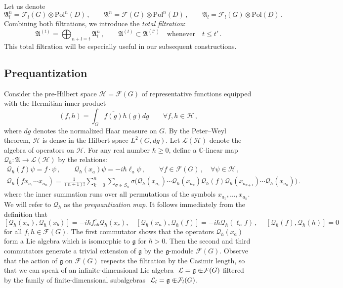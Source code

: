 \documentclass[12pt,a4paper]{article}
\numberwithin{equation}{section}
\theoremstyle{theorem}
\theoremstyle{remark}
\newcommand{\hh}{\mathcal{H}}
\newcommand{\fg}{\mathcal{F}(G)}
\newcommand{\fa}{\mathfrak{A}}
\newcommand{\qq}{\mathcal{Q}_{\hbar}}
\begin{document}
Let us denote 
$$
\fa^n_l=\mathcal{F}_l(G)\otimes \mathrm{Pol}^n(D)\,,\qquad \fa^n=\fg\otimes \mathrm{Pol}^n(D)\,,\qquad \fa_l=\mathcal{F}_l(G)\otimes \mathrm{Pol}(D)\,.
$$
Combining both filtrations, we introduce  the {\it total filtration}: 
\begin{equation}\label{TF}
\fa^{(t)}=\bigoplus_{n+l=t}\fa_l^n\,,\qquad \fa^{(t)}\subset \fa^{(t')}\quad\mbox{whenever}\quad t\leq t'\,.
\end{equation}
This total filtration will be especially useful in our subsequent constructions. 

\subsection{Prequantization}\label{pre-Q}
Consider the pre-Hilbert space $\hh=\fg$ of representative functions equipped with the Hermitian inner product
\begin{equation}
    (f,h)=\int_G\overline{ f(g)} h(g)dg\qquad \forall f, h\in \hh\,,
\end{equation}
where $dg$ denotes the normalized Haar measure on $G$. By the Peter--Weyl theorem, $\hh$ is dense in the Hilbert space $L^2(G, dg)$. Let $\mathscr{L}(\hh)$ denote the algebra of operators on $\hh$.  For any real number $\hbar\geq 0$, define a $\mathbb{C}$-linear  map 
$\qq:\fa\rightarrow \mathscr{L}(\hh)$ by the relations:
\begin{equation}\label{PQ}
\begin{array}{c}
   \qq(f)\psi=f\cdot \psi\,,\qquad  \qq(x_a)\psi=-i\hbar\ell_a\psi \,,\qquad \forall f\in \fg\,,\quad\forall \psi\in\hh\,,\\[5mm]
 \displaystyle    \qq(fx_{a_1}\cdots x_{a_n})=\frac{1}{(n+1)!}\sum_{k=0}^n\sum_{\sigma\in S_{n}} \sigma\big( \qq(x_{a_1})\cdots \qq(x_{a_k})\qq(f)\qq(x_{a_{k+1}})\cdots \qq(x_{a_n})\big)\,.
 \end{array}
\end{equation}
where the inner summation runs over all permutations of the symbols $x_{a_1},\ldots, x_{a_n}$.  We will refer to $\qq$ as the {\it prequantization map}. It follows immediately from the definition that
\begin{equation}\label{QQ}
   [\qq(x_a), \qq(x_b)]=-i\hbar f_{ab}^c \qq(x_c),  \quad [\qq(x_a),\qq(f)]=-i\hbar\qq(\ell_af)\,,\ \quad [\qq(f),\qq(h)]=0
\end{equation}
 for all $f,h\in \fg$.  The first commutator shows that the operators $\qq(x_a)$ form a Lie algebra which is isomorphic to $\mathfrak{g}$ for $\hbar>0$. Then the second and third commutators  generate a trivial  extension  of  $\mathfrak{g}$ by the $\mathfrak{g}$-module $\fg$. Observe that the action of $\mathfrak{g}$ on $\fg$ respects the filtration by the Casimir length, so that we can speak of an infinite-dimensional  Lie algebra $~{\mathcal{L}=\mathfrak{g}\subset\hspace{-1em}+\fg}$ filtered by the family of finite-dimensional subalgebras $~{\mathcal{L}_l=\mathfrak{g}\subset\hspace{-1em}+\mathcal{F}_l(G)}$. 
\end{document}
